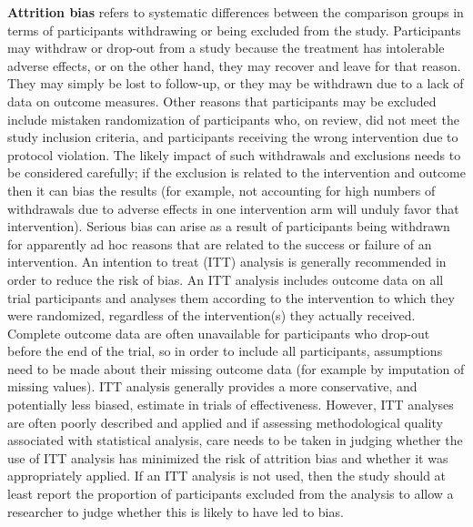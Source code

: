 \documentclass[
  10pt,
  a4paper,
  DIV=11,
  numbers=noendperiod]{scrreprt}
\begin{document}
\textbf{Attrition bias} refers to systematic differences between the
comparison groups in terms of participants withdrawing or being excluded
from the study. Participants may withdraw or drop-out from a study
because the treatment has intolerable adverse effects, or on the other
hand, they may recover and leave for that reason. They may simply be
lost to follow-up, or they may be withdrawn due to a lack of data on
outcome measures. Other reasons that participants may be excluded
include mistaken randomization of participants who, on review, did not
meet the study inclusion criteria, and participants receiving the wrong
intervention due to protocol violation. The likely impact of such
withdrawals and exclusions needs to be considered carefully; if the
exclusion is related to the intervention and outcome then it can bias
the results (for example, not accounting for high numbers of withdrawals
due to adverse effects in one intervention arm will unduly favor that
intervention). Serious bias can arise as a result of participants being
withdrawn for apparently ad hoc reasons that are related to the success
or failure of an intervention. An intention to treat (ITT) analysis is
generally recommended in order to reduce the risk of bias. An ITT
analysis includes outcome data on all trial participants and analyses
them according to the intervention to which they were randomized,
regardless of the intervention(s) they actually received. Complete
outcome data are often unavailable for participants who drop-out before
the end of the trial, so in order to include all participants,
assumptions need to be made about their missing outcome data (for
example by imputation of missing values). ITT analysis generally
provides a more conservative, and potentially less biased, estimate in
trials of effectiveness. However, ITT analyses are often poorly
described and applied and if assessing methodological quality associated
with statistical analysis, care needs to be taken in judging whether the
use of ITT analysis has minimized the risk of attrition bias and whether
it was appropriately applied. If an ITT analysis is not used, then the
study should at least report the proportion of participants excluded
from the analysis to allow a researcher to judge whether this is likely
to have led to bias.
\end{document}
